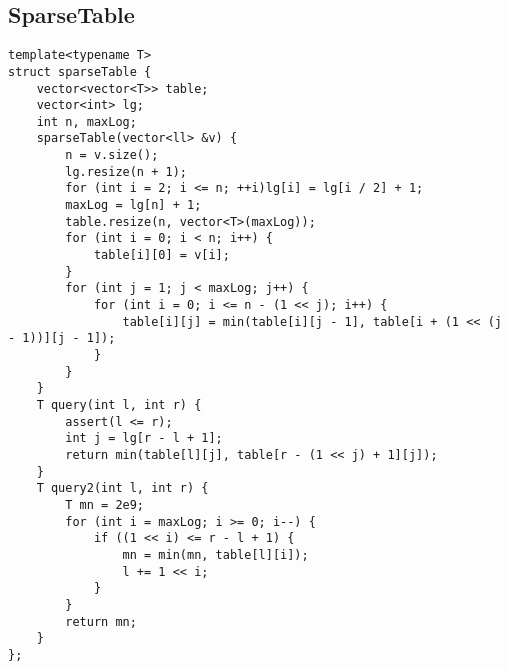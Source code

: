 \documentclass{article}
\begin{document}
\subsection{SparseTable}
\begin{verbatim}
template<typename T>
struct sparseTable {
    vector<vector<T>> table;
    vector<int> lg;
    int n, maxLog;
    sparseTable(vector<ll> &v) {
        n = v.size();
        lg.resize(n + 1);
        for (int i = 2; i <= n; ++i)lg[i] = lg[i / 2] + 1;
        maxLog = lg[n] + 1;
        table.resize(n, vector<T>(maxLog));
        for (int i = 0; i < n; i++) {
            table[i][0] = v[i];
        }
        for (int j = 1; j < maxLog; j++) {
            for (int i = 0; i <= n - (1 << j); i++) {
                table[i][j] = min(table[i][j - 1], table[i + (1 << (j - 1))][j - 1]);
            }
        }
    }
    T query(int l, int r) {
        assert(l <= r);
        int j = lg[r - l + 1];
        return min(table[l][j], table[r - (1 << j) + 1][j]);
    }
    T query2(int l, int r) {
        T mn = 2e9;
        for (int i = maxLog; i >= 0; i--) {
            if ((1 << i) <= r - l + 1) {
                mn = min(mn, table[l][i]);
                l += 1 << i;
            }
        }
        return mn;
    }
};
\end{verbatim}
\end{document}

